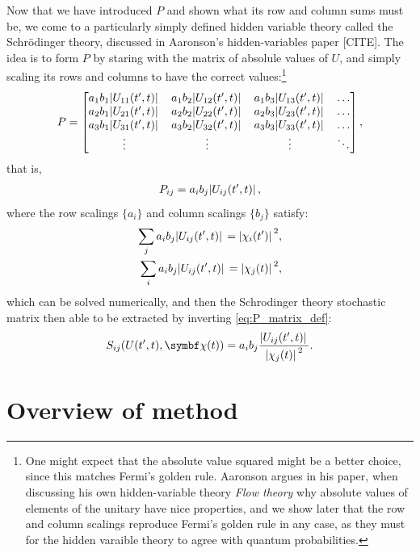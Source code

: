 Now that we have introduced $P$ and shown what its row and column sums must be, we come to a particularly simply defined hidden variable theory called the Schr\"odinger theory, discussed in Aaronson's hidden-variables paper [CITE]. The idea is to form $P$ by staring with the matrix of absolule values of $U$, and simply scaling its rows and columns to have the correct values:\footnote{One might expect that the absolute value squared might be a better choice, since this matches Fermi's golden rule. Aaronson argues in his paper, when discussing his own hidden-variable theory \emph{Flow theory} why absolute values of elements of the unitary have nice properties, and we show later that the row and column scalings reproduce Fermi's golden rule in any case, as they must for the hidden varaible theory to agree with quantum probabilities.}
\begin{align}
P = \left[\begin{matrix}
a_1b_1\abs{U_{11}(t^\prime, t)} & a_1b_2\abs{U_{12}(t^\prime, t)} & a_1b_3\abs{U_{13}(t^\prime, t)}&\hdots\\
a_2b_1\abs{U_{21}(t^\prime, t)} & a_2b_2\abs{U_{22}(t^\prime, t)} & a_2b_3\abs{U_{23}(t^\prime, t)}&\hdots\\
a_3b_1\abs{U_{31}(t^\prime, t)} & a_3b_2\abs{U_{32}(t^\prime, t)} & a_3b_3\abs{U_{33}(t^\prime, t)}&\hdots\\
\vdots & \vdots & \vdots & \ddots
\end{matrix}\right],
\end{align}
that is,
\begin{align}
P_{ij} = a_i b_j \abs{U_{ij}(t^\prime, t)},
\end{align}
where the row scalings $\{a_i\}$ and column scalings $\{b_j\}$ satisfy:
\begin{align}
\sum_j a_i b_j \abs{U_{ij}(t^\prime, t)} = \abs{\chi_i(t^\prime)}^2,\label{eq:a_scalings}\\
\sum_i a_i b_j \abs{U_{ij}(t^\prime, t)} = \abs{\chi_j(t)}^2\label{eq:b_scalings},
\end{align}
which can be solved numerically, and then the Schrodinger theory stochastic matrix then able to be extracted by inverting \eqref{eq:P_matrix_def}:
\begin{align}
S_{ij}(U(t^\prime, t), \vec\chi(t))
= a_i b_j \frac{\abs{U_{ij}(t^\prime, t)}}{\abs{\chi_j(t)}^2}.
\end{align}

\section{Overview of method}

